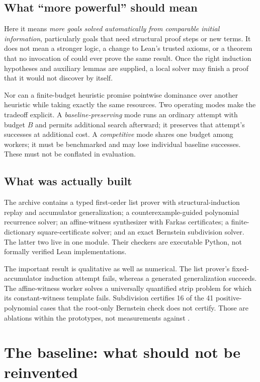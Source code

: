\subsection{What ``more powerful'' should mean}

Here it means \emph{more goals solved automatically from comparable initial
information}, particularly goals that need structural proof steps or new
terms. It does not mean a stronger logic, a change to Lean's trusted axioms,
or a theorem that no invocation of \Grind{} could ever prove the same result.
Once the right induction hypotheses and auxiliary lemmas are supplied, a local
solver may finish a proof that it would not discover by itself.

Nor can a finite-budget heuristic promise pointwise dominance over another
heuristic while taking exactly the same resources. Two operating modes make
the tradeoff explicit. A \emph{baseline-preserving} mode runs an ordinary
\Grind{} attempt with budget $B$ and permits additional search afterward; it
preserves that attempt's successes at additional cost. A \emph{competitive}
mode shares one budget among workers; it must be benchmarked and may lose
individual baseline successes. These must not be conflated in evaluation.

\subsection{What was actually built}

The archive contains a typed first-order list prover with structural-induction
replay and accumulator generalization; a counterexample-guided polynomial
recurrence solver; an affine-witness synthesizer with Farkas certificates; a
finite-dictionary square-certificate solver; and an exact Bernstein subdivision
solver. The latter two live in one module. Their checkers are executable Python,
not formally verified Lean implementations.

The important result is qualitative as well as numerical. The list prover's
fixed-accumulator induction attempt fails, whereas a generated generalization
succeeds. The affine-witness worker solves a universally quantified strip
problem for which its constant-witness template fails. Subdivision certifies
16 of the 41 positive-polynomial cases that the root-only Bernstein check does
not certify. Those are ablations within the prototypes, not measurements
against \Grind{}.

\section{The baseline: what should not be reinvented}

